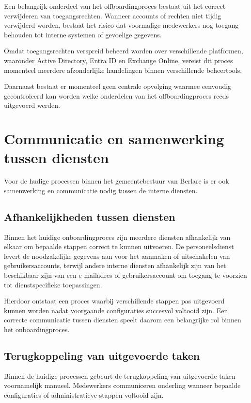 Een belangrijk onderdeel van het offboardingproces bestaat uit het correct verwijderen van toegangsrechten. Wanneer accounts of rechten niet tijdig verwijderd worden, bestaat het risico dat voormalige medewerkers nog toegang behouden tot interne systemen of gevoelige gegevens.

Omdat toegangsrechten verspreid beheerd worden over verschillende platformen, waaronder Active Directory, Entra ID en Exchange Online, vereist dit proces momenteel meerdere afzonderlijke handelingen binnen verschillende beheertools.

Daarnaast bestaat er momenteel geen centrale opvolging waarmee eenvoudig gecontroleerd kan worden welke onderdelen van het offboardingproces reeds uitgevoerd werden.

\section{Communicatie en samenwerking tussen diensten}

Voor de hudige processen binnen het gemeentebestuur van Berlare is er ook samenwerking en communicatie nodig tussen de interne diensten.

\subsection{Afhankelijkheden tussen diensten}

Binnen het huidige onboardingproces zijn meerdere diensten afhankelijk van elkaar om bepaalde stappen correct te kunnen uitvoeren. De personeelsdienst levert de noodzakelijke gegevens aan voor het aanmaken of uitschakelen van gebruikersaccounts, terwijl andere interne diensten afhankelijk zijn van het beschikbaar zijn van een e-mailadres of gebruikersaccount om toegang te voorzien tot dienstspecifieke toepassingen.

Hierdoor ontstaat een proces waarbij verschillende stappen pas uitgevoerd kunnen worden nadat voorgaande configuraties succesvol voltooid zijn. Een correcte communicatie tussen diensten speelt daarom een belangrijke rol binnen het onboardingproces.

\subsection{Terugkoppeling van uitgevoerde taken}

Binnen de huidige processen gebeurt de terugkoppeling van uitgevoerde taken voornamelijk manueel. Medewerkers communiceren onderling wanneer bepaalde configuraties of administratieve stappen voltooid zijn.

